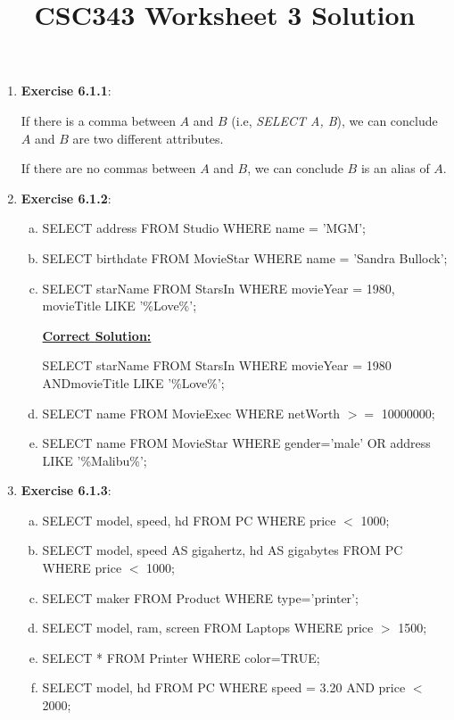 \documentclass[12pt]{article}
\begin{document}
\title{CSC343 Worksheet 3 Solution}
\maketitle

\bigskip

\begin{enumerate}[1.]
    \item \textbf{Exercise 6.1.1}:

    \bigskip

    If there is a comma between $A$ and $B$ (i.e, \textit{SELECT A, B}), we can
    conclude $A$ and $B$ are two different attributes.

    \bigskip

    If there are no commas between $A$ and $B$, we can conclude $B$ is an alias
    of $A$.

    \item \textbf{Exercise 6.1.2}:

    \begin{enumerate}[a)]
        \item SELECT address FROM Studio WHERE name = 'MGM';
        \item SELECT birthdate FROM MovieStar WHERE name = 'Sandra Bullock';
        \item SELECT starName FROM StarsIn WHERE movieYear = 1980, movieTitle LIKE '\%Love\%';

        \bigskip

        \begin{mdframed}
            \underline{\textbf{Correct Solution:}}

            \bigskip

            SELECT starName FROM StarsIn WHERE movieYear = 1980 \color{red}AND\color{black}\:movieTitle LIKE '\%Love\%';
        \end{mdframed}
        \item SELECT name FROM MovieExec WHERE netWorth $>=$ 10000000;
        \item SELECT name FROM MovieStar WHERE gender='male' OR address LIKE '\%Malibu\%';
    \end{enumerate}

    \item \textbf{Exercise 6.1.3}:

    \begin{enumerate}[a)]
        \item SELECT model, speed, hd FROM PC WHERE price $<$ 1000;
        \item SELECT model, speed AS gigahertz, hd AS gigabytes FROM PC WHERE price $<$ 1000;
        \item SELECT maker FROM Product WHERE type='printer';
        \item SELECT model, ram, screen FROM Laptops WHERE price $>$ 1500;
        \item SELECT * FROM Printer WHERE color=TRUE;
        \item SELECT model, hd FROM PC WHERE speed = 3.20 AND price $<$ 2000;
    \end{enumerate}
\end{enumerate}
\end{document}

